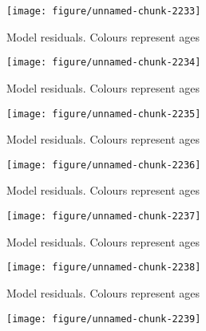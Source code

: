 \documentclass[a4paper]{article}\usepackage{graphicx, color}
\makeatletter
\def\maxwidth{ %
  \ifdim\Gin@nat@width>\linewidth
    \linewidth
  \else
    \Gin@nat@width
  \fi
}
\newenvironment{knitrout}{}{} %
\makeatother
\begin{document}
\begin{knitrout}
\begin{figure}[H]
{\centering \texttt{[image: figure/unnamed-chunk-2233]} 

}

\caption[Model residuals]{Model residuals. Colours represent ages\label{fig:unnamed-chunk-2233}}
\end{figure}
\begin{figure}[H]


{\centering \texttt{[image: figure/unnamed-chunk-2234]} 

}

\caption[Model residuals]{Model residuals. Colours represent ages\label{fig:unnamed-chunk-2234}}
\end{figure}
\begin{figure}[H]


{\centering \texttt{[image: figure/unnamed-chunk-2235]} 

}

\caption[Model residuals]{Model residuals. Colours represent ages\label{fig:unnamed-chunk-2235}}
\end{figure}
\begin{figure}[H]


{\centering \texttt{[image: figure/unnamed-chunk-2236]} 

}

\caption[Model residuals]{Model residuals. Colours represent ages\label{fig:unnamed-chunk-2236}}
\end{figure}
\begin{figure}[H]


{\centering \texttt{[image: figure/unnamed-chunk-2237]} 

}

\caption[Model residuals]{Model residuals. Colours represent ages\label{fig:unnamed-chunk-2237}}
\end{figure}
\begin{figure}[H]


{\centering \texttt{[image: figure/unnamed-chunk-2238]} 

}

\caption[Model residuals]{Model residuals. Colours represent ages\label{fig:unnamed-chunk-2238}}
\end{figure}
\begin{figure}[H]


{\centering \texttt{[image: figure/unnamed-chunk-2239]} 

}


\end{figure}
\end{knitrout}
\end{document}
